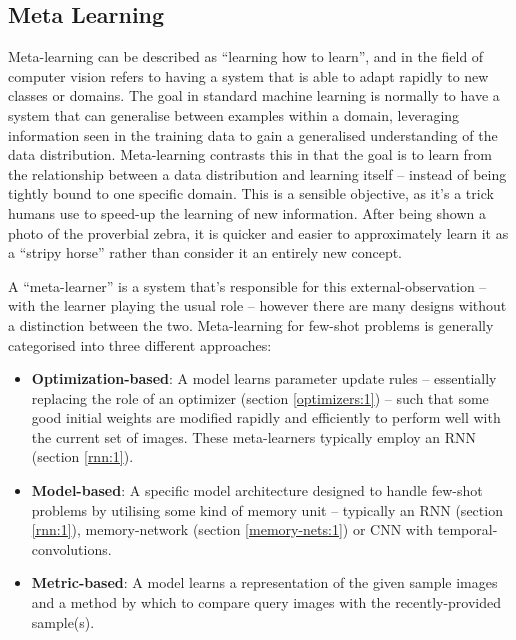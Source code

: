 \documentclass{report}
\begin{document}
	\subsection{Meta Learning}
	Meta-learning can be described as ``learning how to learn'', and in the field of computer vision refers to having a system that is able to adapt rapidly to new classes or domains. The goal in standard machine learning is normally to have a system that can generalise between examples within a domain, leveraging information seen in the training data to gain a generalised understanding of the data distribution. Meta-learning contrasts this in that the goal is to learn from the relationship between a data distribution and learning itself -- instead of being tightly bound to one specific domain. This is a sensible objective, as it's a trick humans use to speed-up the learning of new information. After being shown a photo of the proverbial zebra, it is quicker and easier to approximately learn it as a ``stripy horse'' rather than consider it an entirely new concept. \par
	A ``meta-learner'' is a system that's responsible for this external-observation -- with the learner playing the usual role -- however there are many designs without a distinction between the two. Meta-learning for few-shot problems is generally categorised into three different approaches:
	\begin{itemize}
		\item \textbf{Optimization-based}: A model learns parameter update rules -- essentially replacing the role of an optimizer (section \ref{optimizers:1}) -- such that some good initial weights are modified rapidly and efficiently to perform well with the current set of images. These meta-learners typically employ an RNN (section \ref{rnn:1}).
		\item \textbf{Model-based}: A specific model architecture designed to handle few-shot problems by utilising some kind of memory unit -- typically an RNN (section \ref{rnn:1}), memory-network (section \ref{memory-nets:1}) or CNN with temporal-convolutions.
		\item \textbf{Metric-based}: A model learns a representation of the given sample images and a method by which to compare query images with the recently-provided sample(s).
	\end{itemize}
\end{document}
